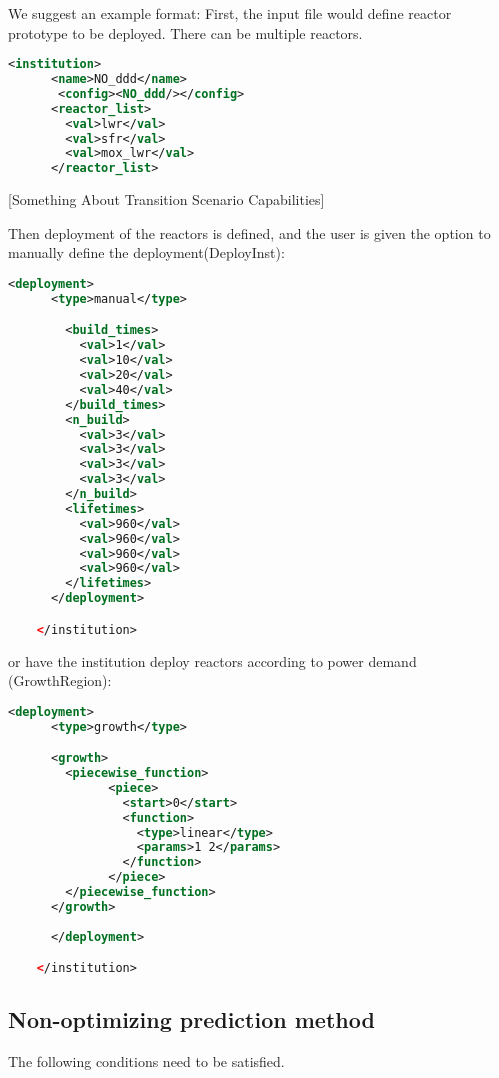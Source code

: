 \documentclass[12pt,letterpaper]{article}
\begin{document}
We suggest an example format:
First, the input file would define reactor prototype to be deployed. There can be multiple reactors.
\begin{lstlisting}[language=XML, caption=One-reactor fleet institution input schema]
<institution>
      <name>NO_ddd</name>
       <config><NO_ddd/></config>
      <reactor_list>
        <val>lwr</val>
        <val>sfr</val>
        <val>mox_lwr</val>
      </reactor_list>
\end{lstlisting}

[Something About Transition Scenario Capabilities]

Then deployment of the reactors is defined, and the user
is given the option to manually define the deployment(DeployInst):
\begin{lstlisting}[language=XML, caption=Reactor deployment input schema]
      <deployment>
      <type>manual</type>

        <build_times>
          <val>1</val>
          <val>10</val>
          <val>20</val>
          <val>40</val>
        </build_times>
        <n_build>
          <val>3</val>
          <val>3</val>
          <val>3</val>
          <val>3</val>
        </n_build>
        <lifetimes>
          <val>960</val>
          <val>960</val>
          <val>960</val>
          <val>960</val>
        </lifetimes>
      </deployment>

    </institution>
\end{lstlisting}

or have the institution
deploy reactors according to power demand (GrowthRegion):

\begin{lstlisting}[language=XML, caption=Reactor deployment input schema]
      <deployment>
      <type>growth</type>

      <growth>
        <piecewise_function>
              <piece>
                <start>0</start>
                <function>
                  <type>linear</type>
                  <params>1 2</params>
                </function>
              </piece>
        </piecewise_function>
      </growth>
      
      </deployment>

    </institution>
\end{lstlisting}

\subsection{Non-optimizing prediction method}
The following conditions need to be satisfied.
\end{document}
